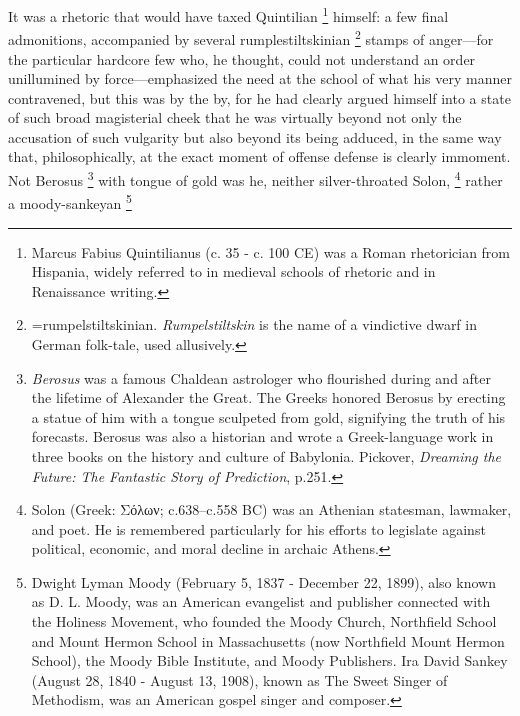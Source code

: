   It was a rhetoric that would have taxed 
Quintilian 
\footnote{ Marcus Fabius Quintilianus (c. 35 - c. 100 CE) was a Roman
rhetorician from Hispania, widely referred to in medieval schools of rhetoric
and in Renaissance writing.
}
himself: a few final admonitions, 
accompanied by several rumplestiltskinian 
\footnote{=rumpelstiltskinian. \textit{Rumpelstiltskin} is the name of a 
  vindictive dwarf in German folk-tale, used allusively. }
stamps of anger---for the
particular hardcore few who, he thought, could not understand an order
unillumined by force---emphasized the need at the school of what his very manner
contravened, 
but this was by the by, for he had clearly argued himself into a
state of such broad magisterial cheek that he was virtually beyond not only the
accusation of such vulgarity but also beyond its being adduced, 
in the same way that, philosophically, at the exact moment of offense defense is 
clearly immoment. 
Not Berosus 
\footnote{ \textit{Berosus} was a famous Chaldean astrologer who flourished
during and after the lifetime of Alexander the Great. The Greeks honored Berosus
by erecting a statue of him with a tongue sculpeted from gold, signifying the
truth of his forecasts. Berosus was also a historian and wrote a Greek-language
work in three books on the history and culture of Babylonia. Pickover, 
\textit{Dreaming the Future: The Fantastic Story of Prediction}, p.251.
}
with tongue of gold was he, neither silver-throated Solon,
\footnote{Solon (Greek: Σόλων; c.638--c.558 BC) was an Athenian statesman,
lawmaker, and poet. He is remembered particularly for his efforts to legislate 
against political, economic, and moral decline in archaic Athens.}
rather a moody-sankeyan 
\footnote{
Dwight Lyman Moody (February 5, 1837 - December 22, 1899), also known as D. L.
Moody, was an American evangelist and publisher connected with the Holiness
Movement, who founded the Moody Church, Northfield School and Mount Hermon
School in Massachusetts (now Northfield Mount Hermon School), the Moody Bible
Institute, and Moody Publishers.
Ira David Sankey (August 28, 1840 - August 13, 1908), known as The Sweet Singer
of Methodism, was an American gospel singer and composer.
}
